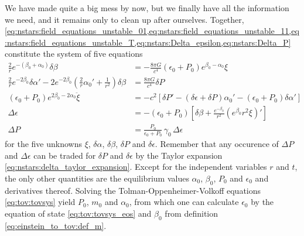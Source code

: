 We have made quite a big mess by now, but we finally have all the information we need, and it remains only to clean up after ourselves.
Together, \cref{eq:nstars:field_equations_unstable_01,eq:nstars:field_equations_unstable_11,eq:nstars:field_equations_unstable_T,eq:nstars:Delta_epsilon,eq:nstars:Delta_P} constitute the system of five equations
\begin{subequations}
\begin{align}
	\frac{2}{r} e^{-(\beta_0 + \alpha_0)} \delta\beta                                                                           &= - \frac{8 \pi G}{c^4} (\epsilon_0 + P_0) e^{\beta_0 - \alpha_0} \xi \\
	\frac{2}{r} e^{-2\beta_0} \delta\alpha' - 2 e^{-2 \beta_0} \left( \frac{2}{r} \alpha_0' + \frac{1}{r^2} \right) \delta\beta &= \frac{8 \pi G}{c^4} \delta P                                  \\
	\left( \epsilon_0 + P_0 \right) e^{2 \beta_0 - 2 \alpha_0} \ddot \xi                                                        &= -c^2 \left[ \delta P' - \left( \delta \epsilon + \delta P \right) \alpha_0' - \left( \epsilon_0 + P_0 \right) \delta \alpha' \right] \\
	\Delta \epsilon                                                                                                             &= - \left( \epsilon_0 + P_0 \right) \left[ \delta\beta + \frac{e^{-\beta_0}}{r^2} \left( e^{\beta_0} r^2 \xi \right)' \right]  \\
	\Delta P &= \frac{P_0}{\epsilon_0 + P_0} \, \gamma_0 \, \Delta \epsilon
\end{align}%
\label{eq:nstars:perturbation_system}%
\end{subequations}%
for the five unknowns $\xi$, $\delta \alpha$, $\delta \beta$, $\delta P$ and $\delta \epsilon$.
Remember that any occurence of $\Delta P$ and $\Delta \epsilon$ can be traded for $\delta P$ and $\delta \epsilon$ by the Taylor expansion \eqref{eq:nstars:delta_taylor_expansion}.
Except for the independent variables $r$ and $t$, the only other quantities are the equilibrium values $\alpha_0$, $\beta_0$, $P_0$ and $\epsilon_0$ and derivatives thereof.
Solving the Tolman-Oppenheimer-Volkoff equations \eqref{eq:tov:tovsys} yield $P_0$, $m_0$ and $\alpha_0$, from which one can calculate $\epsilon_0$ by the equation of state \eqref{eq:tov:tovsys_eos} and $\beta_0$ from definition \eqref{eq:einstein_to_tov:def_m}.

